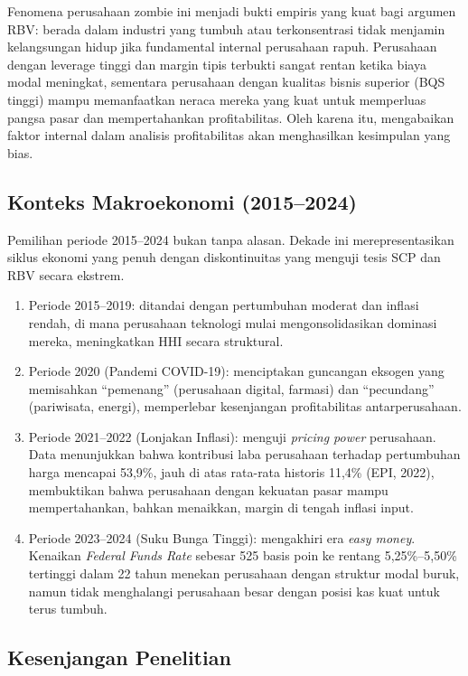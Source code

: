 \documentclass[12pt,a4paper]{report}
\begin{document}
Fenomena perusahaan zombie ini menjadi bukti empiris yang kuat bagi argumen RBV: berada dalam industri yang tumbuh atau terkonsentrasi tidak menjamin kelangsungan hidup jika fundamental internal perusahaan rapuh. Perusahaan dengan leverage tinggi dan margin tipis terbukti sangat rentan ketika biaya modal meningkat, sementara perusahaan dengan kualitas bisnis superior (BQS tinggi) mampu memanfaatkan neraca mereka yang kuat untuk memperluas pangsa pasar dan mempertahankan profitabilitas. Oleh karena itu, mengabaikan faktor internal dalam analisis profitabilitas akan menghasilkan kesimpulan yang bias.

\subsection{Konteks Makroekonomi (2015--2024)}

Pemilihan periode 2015--2024 bukan tanpa alasan. Dekade ini merepresentasikan siklus ekonomi yang penuh dengan diskontinuitas yang menguji tesis SCP dan RBV secara ekstrem.

\begin{enumerate}
    \item Periode 2015--2019: ditandai dengan pertumbuhan moderat dan inflasi rendah, di mana perusahaan teknologi mulai mengonsolidasikan dominasi mereka, meningkatkan HHI secara struktural.
    \item Periode 2020 (Pandemi COVID-19): menciptakan guncangan eksogen yang memisahkan ``pemenang'' (perusahaan digital, farmasi) dan ``pecundang'' (pariwisata, energi), memperlebar kesenjangan profitabilitas antarperusahaan.
    \item Periode 2021--2022 (Lonjakan Inflasi): menguji \textit{pricing power} perusahaan. Data menunjukkan bahwa kontribusi laba perusahaan terhadap pertumbuhan harga mencapai 53,9\%, jauh di atas rata-rata historis 11,4\% (EPI, 2022), membuktikan bahwa perusahaan dengan kekuatan pasar mampu mempertahankan, bahkan menaikkan, margin di tengah inflasi input.
    \item Periode 2023--2024 (Suku Bunga Tinggi): mengakhiri era \textit{easy money}. Kenaikan \textit{Federal Funds Rate} sebesar 525 basis poin ke rentang 5,25\%--5,50\% tertinggi dalam 22 tahun menekan perusahaan dengan struktur modal buruk, namun tidak menghalangi perusahaan besar dengan posisi kas kuat untuk terus tumbuh.
\end{enumerate}

\subsection{Kesenjangan Penelitian}
\end{document}
